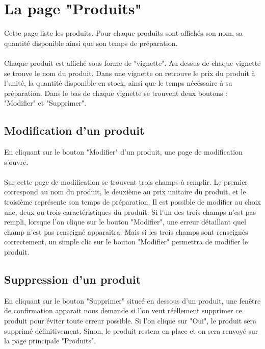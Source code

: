 \section{La page "Produits"}
Cette page liste les produits. Pour chaque produits sont affichés son nom, sa 
quantité disponible ainsi que son temps de préparation.

\paragraph{}
Chaque produit est affiché sous forme de "vignette". Au dessus de chaque 
vignette se trouve le nom du produit. Dans une vignette on retrouve le prix du 
produit à l'unité, la quantité disponible en stock, ainsi que le temps nécéssaire 
à sa préparation. Dans le bas de chaque vignette se trouvent deux boutons : 
"Modifier" et "Supprimer".

\subsection{Modification d'un produit}
En cliquant sur le bouton "Modifier" d'un produit, une page de modification 
s'ouvre. 

\paragraph{}
Sur cette page de modification se trouvent trois champs à remplir. 
Le premier correspond au nom du produit, le deuxième au prix unitaire du produit, 
et le troisième représente son temps de préparation. Il est possible de modifier 
au choix une, deux ou trois caractéristiques du produit. Si l'un des trois champs 
n'est pas rempli, lorsque l'on clique sur le bouton "Modifier", une erreur 
détaillant quel champ n'est pas renseigné apparaitra. Mais si les trois champs 
sont renseignés correctement, un simple clic sur le bouton "Modifier" permettra 
de modifier le produit.

\subsection{Suppression d'un produit}
En cliquant sur le bouton "Supprimer" situeé en dessous d'un produit, une 
fenêtre de confirmation apparait nous demande si l'on veut réellement supprimer 
ce produit pour éviter toute erreur possible. Si l'on clique sur "Oui", le 
produit sera supprimé définitivement. Sinon, le produit restera en place et on 
sera renvoyé sur la page principale "Produits".


